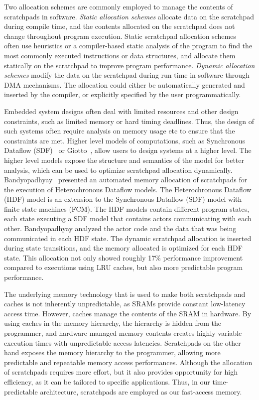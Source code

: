 Two allocation schemes are commonly employed to manage the contents of scratchpads in software.
\emph{Static allocation schemes} allocate data on the scratchpad during compile time, and the contents allocated on the scratchpad does not change throughout program execution. 
Static scratchpad allocation schemes~\cite{Suhendra2005WCETSPM, Patel2008PRETSPM} often use heuristics or a compiler-based static analysis of the program to find the most commonly executed instructions or data structures, and allocate them statically on the scratchpad to improve program performance. 
\emph{Dynamic allocation schemes} modify the data on the scratchpad during run time in software through DMA mechanisms.
The allocation could either be automatically generated and inserted by the compiler, or explicitly specified by the user programmatically.

Embedded system designs often deal with limited resources and other design constraints, such as limited memory or hard timing deadlines.    
Thus, the design of such systems often require analysis on memory usage etc to ensure that the constraints are met. 
Higher level models of computations, such as Synchronous Dataflow (SDF)~\cite{lee_sdf} or Giotto~\cite{henzinger_giotto}, allow users to design systems at a higher level.
The higher level models expose the structure and semantics of the model for better analysis, which can be used to optimize scratchpad allocation dynamically.
Bandyopadhyay~\cite{Bandyopadhyay06_AutomatedMemoryAllocationOfActorCodeDataBufferInHeterochronous} presented an automated memory allocation of scratchpads for the execution of Heterochronous Dataflow models.
The Heterochronous Dataflow (HDF) model is an extension to the Synchronous Dataflow (SDF) model with finite state machines (FCM). 
The HDF models contain different program states, each state executing a SDF model that contains actors communicating with each other. 
Bandyopadhyay analyzed the actor code and the data that was being communicated in each HDF state.
The dynamic scratchpad allocation is inserted during state transitions, and the memory allocated is optimized for each HDF state. 
This allocation not only showed roughly 17\% performance improvement compared to executions using LRU caches, but also more predictable program performance.

The underlying memory technology that is used to make both scratchpads and caches is not inherently unpredictable, as SRAMs provide constant low-latency access time. 
However, caches manage the contents of the SRAM in hardware. 
By using caches in the memory hierarchy, the hierarchy is hidden from the programmer, and hardware managed memory contents creates highly variable execution times with unpredictable access latencies. 
Scratchpads on the other hand exposes the memory hierarchy to the programmer, allowing more predictable and repeatable memory access performances.
Although the allocation of scratchpads requires more effort, but it also provides opportunity for high efficiency, as it can be tailored to specific applications.   
Thus, in our time-predictable architecture, scratchpads are employed as our fast-access memory. 

